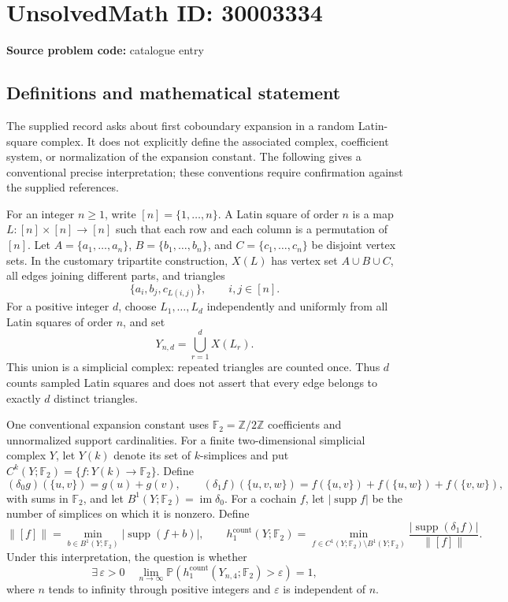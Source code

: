 \documentclass[11pt]{article}
\newcommand{\Z}{\mathbb{Z}}
\newcommand{\F}{\mathbb{F}}
\begin{document}
\section*{UnsolvedMath ID: 30003334}
\textbf{Source problem code:} catalogue entry
\subsection{Definitions and mathematical statement}
The supplied record asks about first coboundary expansion in a random Latin-square complex. It does not explicitly define the associated complex, coefficient system, or normalization of the expansion constant. The following gives a conventional precise interpretation; these conventions require confirmation against the supplied references.

For an integer \(n\geq 1\), write \([n]=\{1,\ldots,n\}\). A Latin square of order \(n\) is a map \(L:[n]\times[n]\to[n]\) such that each row and each column is a permutation of \([n]\). Let \(A=\{a_1,\ldots,a_n\}\), \(B=\{b_1,\ldots,b_n\}\), and \(C=\{c_1,\ldots,c_n\}\) be disjoint vertex sets. In the customary tripartite construction, \(X(L)\) has vertex set \(A\cup B\cup C\), all edges joining different parts, and triangles
\[
\{a_i,b_j,c_{L(i,j)}\},\qquad i,j\in[n].
\]
For a positive integer \(d\), choose \(L_1,\ldots,L_d\) independently and uniformly from all Latin squares of order \(n\), and set
\[
Y_{n,d}=\bigcup_{r=1}^{d}X(L_r).
\]
This union is a simplicial complex: repeated triangles are counted once. Thus \(d\) counts sampled Latin squares and does not assert that every edge belongs to exactly \(d\) distinct triangles.

One conventional expansion constant uses \(\F_2=\Z/2\Z\) coefficients and unnormalized support cardinalities. For a finite two-dimensional simplicial complex \(Y\), let \(Y(k)\) denote its set of \(k\)-simplices and put \(C^k(Y;\F_2)=\{f:Y(k)\to\F_2\}\). Define
\[
(\delta_0g)(\{u,v\})=g(u)+g(v),\qquad
(\delta_1f)(\{u,v,w\})=f(\{u,v\})+f(\{u,w\})+f(\{v,w\}),
\]
with sums in \(\F_2\), and let \(B^1(Y;\F_2)=\operatorname{im}\delta_0\). For a cochain \(f\), let \(|\operatorname{supp}f|\) be the number of simplices on which it is nonzero. Define
\[
\|[f]\|=\min_{b\in B^1(Y;\F_2)}|\operatorname{supp}(f+b)|,
\qquad
h_1^{\mathrm{count}}(Y;\F_2)=
\min_{f\in C^1(Y;\F_2)\setminus B^1(Y;\F_2)}
\frac{|\operatorname{supp}(\delta_1f)|}{\|[f]\|}.
\]
Under this interpretation, the question is whether
\[
\exists\,\varepsilon>0\quad
\lim_{n\to\infty}
\mathbb P\!\left(h_1^{\mathrm{count}}(Y_{n,4};\F_2)>\varepsilon\right)=1,
\]
where \(n\) tends to infinity through positive integers and \(\varepsilon\) is independent of \(n\).
\end{document}
